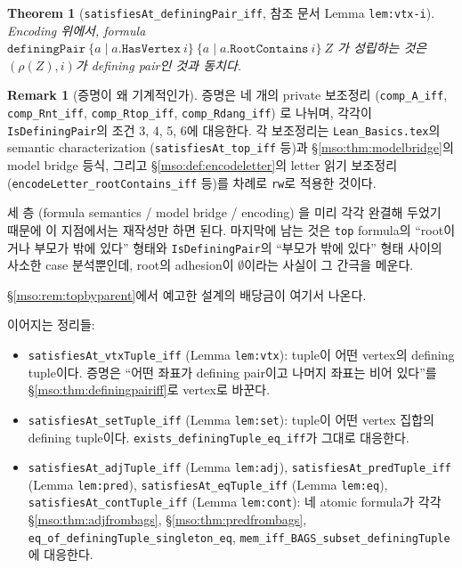 \documentclass[11pt]{article}
\theoremstyle{definition}
\newtheorem{remark}[definition]{Remark}
\theoremstyle{plain}
\newtheorem{theorem}[definition]{Theorem}
\newcommand{\lean}[1]{\texttt{#1}}
\newcommand{\leanfile}[1]{\texttt{#1}}
\begin{document}
\begin{theorem}[\lean{satisfiesAt\_definingPair\_iff}, 참조 문서 Lemma \lean{lem:vtx-i}]
\label{mso:thm:definingpairformula}
Encoding 위에서, formula
$\lean{definingPair}\ \{a \mid a.\lean{HasVertex}\ i\}\ \{a \mid a.\lean{RootContains}\ i\}\ Z$
가 성립하는 것은 $(\rho(Z), i)$가 defining pair인 것과 동치다.
\end{theorem}

\begin{remark}[증명이 왜 기계적인가]
\label{mso:rem:recognitionmechanical}
증명은 네 개의 private 보조정리 (\lean{comp\_A\_iff}, \lean{comp\_Rnt\_iff},
\lean{comp\_Rtop\_iff}, \lean{comp\_Rdang\_iff}) 로 나뉘며, 각각이
\lean{IsDefiningPair}의 조건 3, 4, 5, 6에 대응한다. 각 보조정리는
\leanfile{Lean\_Basics.tex}의 semantic characterization
(\lean{satisfiesAt\_top\_iff} 등)과 \S\ref{mso:thm:modelbridge}의 model bridge
등식, 그리고 \S\ref{mso:def:encodeletter}의 letter 읽기 보조정리
(\lean{encodeLetter\_rootContains\_iff} 등)를 차례로 \lean{rw}로 적용한
것이다.

세 층 (formula semantics / model bridge / encoding) 을 미리 각각 완결해
두었기 때문에 이 지점에서는 재작성만 하면 된다. 마지막에 남는 것은
\lean{top} formula의 ``root이거나 부모가 밖에 있다'' 형태와
\lean{IsDefiningPair}의 ``부모가 밖에 있다'' 형태 사이의 사소한 case 분석뿐인데,
root의 adhesion이 $\emptyset$이라는 사실이 그 간극을 메운다.

\S\ref{mso:rem:topbyparent}에서 예고한 설계의 배당금이 여기서 나온다.
\end{remark}

이어지는 정리들:
\begin{itemize}
  \item \lean{satisfiesAt\_vtxTuple\_iff} (Lemma \lean{lem:vtx}): tuple이 어떤
    vertex의 defining tuple이다. 증명은 ``어떤 좌표가 defining pair이고 나머지
    좌표는 비어 있다''를 \S\ref{mso:thm:definingpairiff}로 vertex로 바꾼다.
  \item \lean{satisfiesAt\_setTuple\_iff} (Lemma \lean{lem:set}): tuple이 어떤
    vertex 집합의 defining tuple이다. \lean{exists\_definingTuple\_eq\_iff}가
    그대로 대응한다.
  \item \lean{satisfiesAt\_adjTuple\_iff} (Lemma \lean{lem:adj}),
    \lean{satisfiesAt\_predTuple\_iff} (Lemma \lean{lem:pred}),
    \lean{satisfiesAt\_eqTuple\_iff} (Lemma \lean{lem:eq}),
    \lean{satisfiesAt\_contTuple\_iff} (Lemma \lean{lem:cont}): 네 atomic
    formula가 각각 \S\ref{mso:thm:adjfrombags}, \S\ref{mso:thm:predfrombags},
    \lean{eq\_of\_definingTuple\_singleton\_eq},
    \lean{mem\_iff\_BAGS\_subset\_definingTuple}에 대응한다.
\end{itemize}
\end{document}
